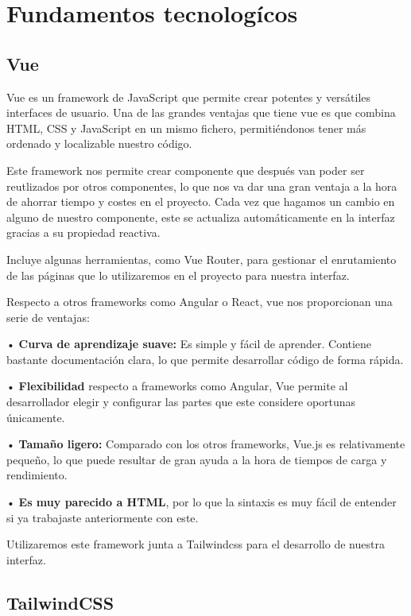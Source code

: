 \chapter{Fundamentos tecnologícos}
\label{chap:Fundamentos tecnologícos}

\section{Vue}

Vue es un framework de JavaScript que permite crear potentes y versátiles interfaces de usuario. Una de las grandes ventajas que tiene vue es que combina HTML, CSS y JavaScript en un mismo fichero, permitiéndonos tener más ordenado y localizable nuestro código. 

Este framework nos permite crear componente que después van poder ser reutlizados por otros componentes, lo que nos va dar una gran ventaja a la hora de ahorrar tiempo y costes en el proyecto.
Cada vez que hagamos un cambio en alguno de nuestro componente, este se actualiza automáticamente en la interfaz gracias a su propiedad reactiva.

Incluye algunas herramientas, como Vue Router, para gestionar el enrutamiento de las páginas que lo utilizaremos en el proyecto para nuestra interfaz.

Respecto a otros frameworks como Angular o React, vue nos proporcionan una serie de ventajas:

• \textbf{Curva de aprendizaje suave:} Es simple y fácil de aprender. Contiene bastante documentación clara, lo que permite desarrollar código de forma rápida.

• \textbf{Flexibilidad} respecto a frameworks como Angular, Vue permite al desarrollador elegir y configurar las partes que este considere oportunas únicamente.

• \textbf{Tamaño ligero:} Comparado con los otros frameworks, Vue.js es relativamente pequeño, lo que puede resultar de gran ayuda a la hora de tiempos de carga y rendimiento.

• \textbf{Es muy parecido a HTML}, por lo que la sintaxis es muy fácil de entender si ya trabajaste anteriormente con este. 


Utilizaremos este framework junta a Tailwindcss para el desarrollo de nuestra interfaz.

\section{TailwindCSS}

